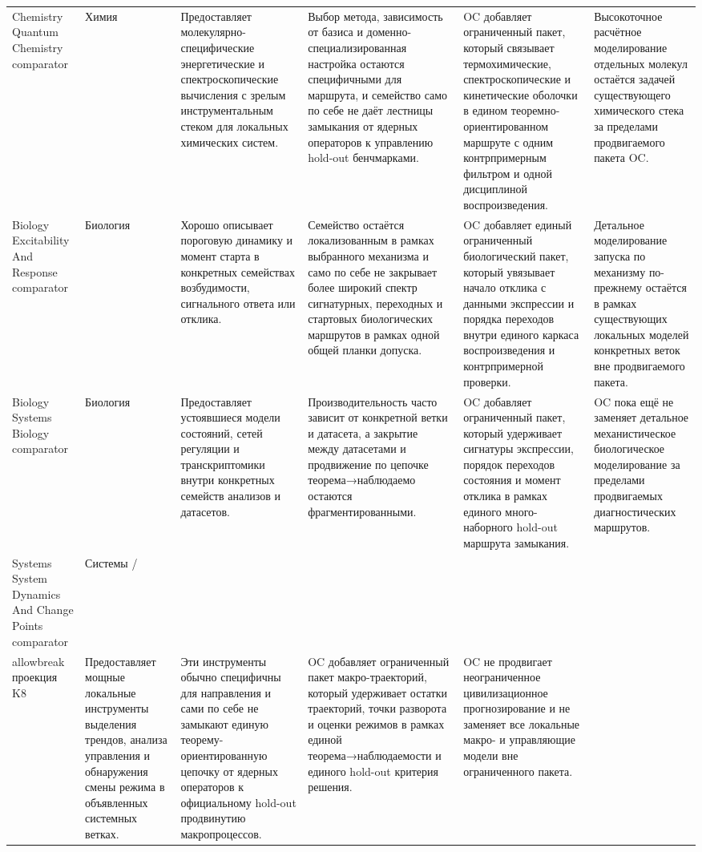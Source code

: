 \begin{longtable}{@{}L{0.17\textwidth}L{0.09\textwidth}L{0.17\textwidth}L{0.17\textwidth}L{0.20\textwidth}L{0.14\textwidth}@{}}
Chemistry Quantum Chemistry comparator & Химия & Предоставляет молекулярно-специфические энергетические и спектроскопические вычисления с зрелым инструментальным стеком для локальных химических систем. & Выбор метода, зависимость от базиса и доменно-специализированная настройка остаются специфичными для маршрута, и семейство само по себе не даёт лестницы замыкания от ядерных операторов к управлению hold-out бенчмарками. & OC добавляет ограниченный пакет, который связывает термохимические, спектроскопические и кинетические оболочки в едином теоремно-ориентированном маршруте с одним контрпримерным фильтром и одной дисциплиной воспроизведения. & Высокоточное расчётное моделирование отдельных молекул остаётся задачей существующего химического стека за пределами продвигаемого пакета OC. \\
Biology Excitability And Response comparator & Биология & Хорошо описывает пороговую динамику и момент старта в конкретных семействах возбудимости, сигнального ответа или отклика. & Семейство остаётся локализованным в рамках выбранного механизма и само по себе не закрывает более широкий спектр сигнатурных, переходных и стартовых биологических маршрутов в рамках одной общей планки допуска. & OC добавляет единый ограниченный биологический пакет, который увязывает начало отклика с данными экспрессии и порядка переходов внутри единого каркаса воспроизведения и контрпримерной проверки. & Детальное моделирование запуска по механизму по-прежнему остаётся в рамках существующих локальных моделей конкретных веток вне продвигаемого пакета. \\
Biology Systems Biology comparator & Биология & Предоставляет устоявшиеся модели состояний, сетей регуляции и транскриптомики внутри конкретных семейств анализов и датасетов. & Производительность часто зависит от конкретной ветки и датасета, а закрытие между датасетами и продвижение по цепочке теорема→наблюдаемо остаются фрагментированными. & OC добавляет ограниченный пакет, который удерживает сигнатуры экспрессии, порядок переходов состояния и момент отклика в рамках единого много-наборного hold-out маршрута замыкания. & OC пока ещё не заменяет детальное механистическое биологическое моделирование за пределами продвигаемых диагностических маршрутов. \\
Systems System Dynamics And Change Points comparator & Системы /\\allowbreak проекция K8 & Предоставляет мощные локальные инструменты выделения трендов, анализа управления и обнаружения смены режима в объявленных системных ветках. & Эти инструменты обычно специфичны для направления и сами по себе не замыкают единую теорему-ориентированную цепочку от ядерных операторов к официальному hold-out продвинутию макропроцессов. & OC добавляет ограниченный пакет макро-траекторий, который удерживает остатки траекторий, точки разворота и оценки режимов в рамках единой теорема→наблюдаемости и единого hold-out критерия решения. & OC не продвигает неограниченное цивилизационное прогнозирование и не заменяет все локальные макро- и управляющие модели вне ограниченного пакета. \\

\end{longtable}
